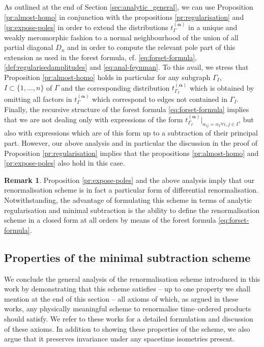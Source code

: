 \documentclass[a4paper,10pt,twoside]{article}
\numberwithin{equation}{section}
\newcounter{and}
\def\balpha{{\boldsymbol{\alpha}}}
\theoremstyle{plain}
\theoremstyle{definition}
\newtheorem{rem}[theo]{Remark}
\begin{document}
As outlined at the end of Section \ref{sec:analytic_general}, we can use Proposition \ref{pr:almost-homo} in conjunction with the propositions \ref{pr:regularisation} and \ref{pr:expose-poles} in order to extend the distributions $t_\Gamma^{(\balpha)}$ in a unique and weakly meromorphic fashion to a normal neighbourhood of the union of all partial diagonal $D_n$ and in order to compute the relevant pole part of this extension as used in the forest formula, cf. \eqref{eq:forset-formula}, \eqref{def:regularisedamplitudes} and \eqref{eq:anal-feynman}. To this avail, we stress that Proposition \ref{pr:almost-homo} holds in particular for any subgraph $\Gamma_I$, $I\subset\{1,\dots,n\}$ of $\Gamma$ and the corresponding distribution $t_{\Gamma_I}^{(\balpha)}$ which is obtained by omitting all factors in $t_{\Gamma}^{(\balpha)}$ which correspond to edges not contained in $\Gamma_I$. Finally, the recursive structure of the forest formula \eqref{eq:forset-formula} implies that we are not dealing only with expressions of the form $t_{\Gamma_I}^{(\balpha)}|_{\alpha_{ij}=\alpha_I \forall i,j\in I}$, but also with expressions which are of this form up to a subtraction of their principal part. However, our above analysis and in particular the discussion in the proof of Proposition \ref{pr:regularisation} implies that the propositions \ref{pr:almost-homo} and \ref{pr:expose-poles} also hold in this case.

\begin{rem}\label{rem:differential}
Proposition \ref{pr:expose-poles} and the above analysis imply that our renormalisation scheme is in fact a particular form of differential renormalisation. Notwithstanding, the advantage of formulating this scheme in terms of analytic regularisation and minimal subtraction is the ability to define the renormalisation scheme in a closed form at all orders by means of the forest formula \eqref{eq:forset-formula}.
\end{rem}

\subsection{Properties of the minimal subtraction scheme}

We conclude the general analysis of the renormalisation scheme introduced in this work by demonstrating that this scheme satisfies -- up to one property we shall mention at the end of this section -- all axioms of \cite{Hollands:2001nf,Hollands:2001b,  Hollands:2004yh} which, as argued in these works, any physically meaningful scheme to renormalise time--ordered products should satisfy. We refer to these works for a detailed formulation and discussion of these axioms. In addition to showing these properties of the scheme, we also argue that it preserves invariance under any spacetime isometries present.
\end{document}
